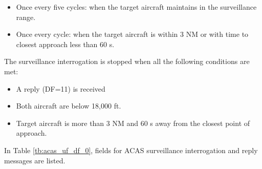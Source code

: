 \begin{itemize}
  \item Once every five cycles: when the target aircraft maintains in the surveillance range.
  \item Once every cycle: when the target aircraft is within 3 NM or with time to closest approach less than 60 s.
\end{itemize}


The surveillance interrogation is stopped when all the following conditions are met:

\begin{itemize}
  \item A reply (DF=11) is received
  \item Both aircraft are below 18,000 ft.
  \item Target aircraft is more than 3 NM and 60 s away from the closest point of approach.
\end{itemize}


In Table \ref{tb:acas_uf_df_0}, fields for ACAS surveillance interrogation and reply messages are listed.

